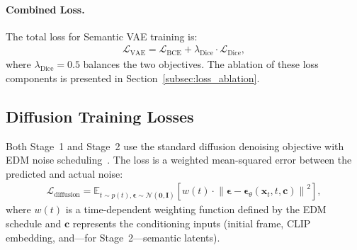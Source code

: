 \paragraph{Combined Loss.}
The total loss for Semantic VAE training is:
\begin{align}
    \mathcal{L}_{\text{VAE}} = \mathcal{L}_{\text{BCE}} + \lambda_{\text{Dice}} \cdot \mathcal{L}_{\text{Dice}},
    \label{eq:total_vae_loss}
\end{align}
where $\lambda_{\text{Dice}} = 0.5$ balances the two objectives. The ablation of these loss components is presented in Section~\ref{subsec:loss_ablation}.

\subsection{Diffusion Training Losses}
\label{subsec:diffusion_losses}

Both Stage~1 and Stage~2 use the standard diffusion denoising objective with EDM noise scheduling~\cite{karras2022elucidating}. The loss is a weighted mean-squared error between the predicted and actual noise:
\begin{align}
    \mathcal{L}_{\text{diffusion}} = \mathbb{E}_{t \sim p(t), \boldsymbol{\epsilon} \sim \mathcal{N}(\mathbf{0}, \mathbf{I})}\!\left[w(t) \cdot \left\|\boldsymbol{\epsilon} - \boldsymbol{\epsilon}_\theta(\mathbf{x}_t, t, \mathbf{c})\right\|^2\right],
    \label{eq:diffusion_loss}
\end{align}
where $w(t)$ is a time-dependent weighting function defined by the EDM schedule and $\mathbf{c}$ represents the conditioning inputs (initial frame, CLIP embedding, and---for Stage~2---semantic latents).
